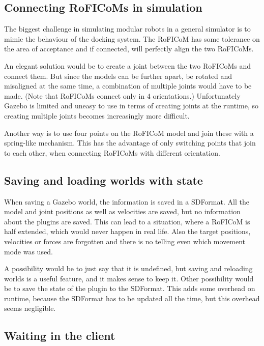 \documentclass[
  digital, %
  table,   %
  oneside, %
  nolof,     %
  nolot,     %
]{fithesis3}
\begin{document}
\subsection{Connecting RoFICoMs in simulation}

The biggest challenge in simulating modular robots in a general simulator is to mimic the behaviour of the docking system.
The RoFICoM has some tolerance\cite{roficom} on the area of acceptance and if connected, will perfectly align the two RoFICoMs.

An elegant solution would be to create a joint between the two RoFICoMs and connect them.
But since the models can be further apart, be rotated and misaligned at the same time, a combination of multiple joints would have to be made.
(Note that RoFICoMs connect only in 4 orientations.)
Unfortunately Gazebo is limited and uneasy to use in terms of creating joints at the runtime, so creating multiple joints becomes increasingly more difficult.

Another way is to use four points on the RoFICoM model and join these with a spring-like mechanism.
This has the advantage of only switching points that join to each other, when connecting RoFICoMs with different orientation.

\subsection{Saving and loading worlds with state}

When saving a Gazebo world, the information is saved in a SDFormat.
All the model and joint positions as well as velocities are saved, but no information about the plugins are saved.
This can lead to a situation, where a RoFICoM is half extended, which would never happen in real life.
Also the target positions, velocities or forces are forgotten and there is no telling even which movement mode was used.

A possibility would be to just say that it is undefined, but saving and reloading worlds is a useful feature, and it makes sense to keep it.
Other possibility would be to save the state of the plugin to the SDFormat.
This adds some overhead on runtime, because the SDFormat has to be updated all the time, but this overhead seems negligible.

\subsection{Waiting in the client}
\end{document}
